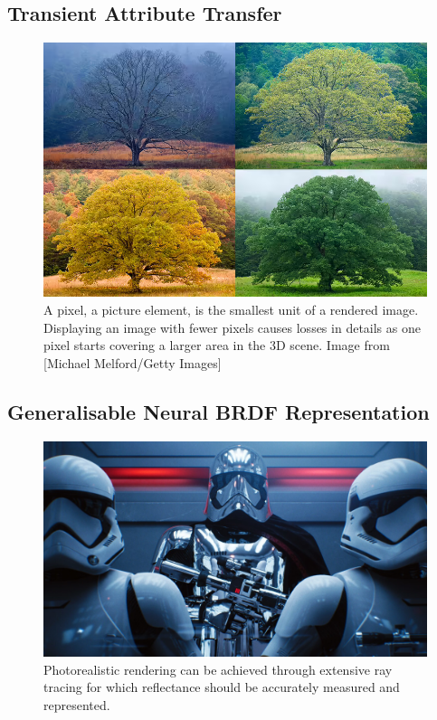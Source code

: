 \subsection{Transient Attribute Transfer}
\begin{figure}[ht]
  \centering

    \includegraphics[width=\linewidth]{Images/seasonchanges.png}

   \caption{A pixel, a picture element, is the smallest unit of a rendered image. Displaying an image with fewer pixels causes losses in details as one pixel starts covering a larger area in the 3D scene. Image from [Michael Melford/Getty Images]}
   \label{fig:colour-approximate}
\end{figure}

\subsection{Generalisable Neural BRDF Representation}

\begin{figure}[ht]
  \centering

    \includegraphics[width=\linewidth]{Images/StarWars-RayTracing.jpeg}

   \caption{Photorealistic rendering can be achieved through extensive ray tracing for which reflectance should be accurately measured and represented.}
   \label{fig:colour-approximate}
\end{figure}



